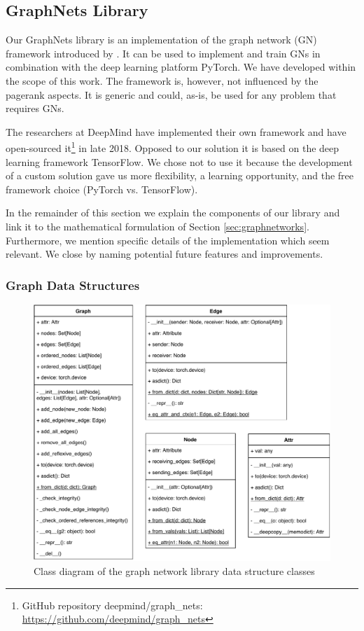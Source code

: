 \subsection{GraphNets Library}
\label{sec:gnlib}

Our GraphNets library is an implementation of the graph network (GN) framework introduced by \cite{deepmind:graphnets}. It can be used to implement and train GNs in combination with the deep learning platform PyTorch. We have developed within the scope of this work. The framework is, however, not influenced by the pagerank aspects. It is generic and could, as-is, be used for any problem that requires GNs.

The researchers at DeepMind have implemented their own framework and have open-sourced it\footnote{GitHub repository deepmind/graph\_nets: \url{https://github.com/deepmind/graph_nets}} in late 2018. Opposed to our solution it is based on the deep learning framework TensorFlow. We chose not to use it because the development of a custom solution gave us more flexibility, a learning opportunity, and the free framework choice (PyTorch vs. TensorFlow).

In the remainder of this section we explain the components of our library and link it to the mathematical formulation of Section \ref{sec:graphnetworks}. Furthermore, we mention specific details of the implementation which seem relevant. We close by naming potential future features and improvements.

\subsubsection{Graph Data Structures}

\begin{figure}\centering
    \includegraphics[scale=0.65]{resources/graphnets-datastructs}
    \caption{Class diagram of the graph network library data structure classes}\label{fig:classdiagramgndatastructs}
\end{figure}

